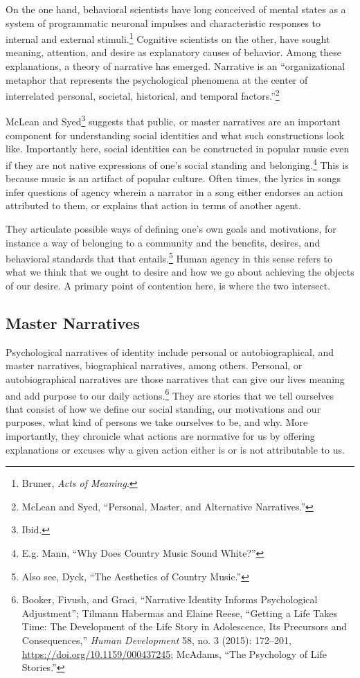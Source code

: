 \documentclass[phdthesis,12pt,final]{wuthesis}
\theoremstyle{definition}
\theoremstyle{definition}
\theoremstyle{definition}
\theoremstyle{definition}
\theoremstyle{remark}
\begin{document}
On the one hand, behavioral scientists have long conceived of mental states as a system of programmatic neuronal impulses and characteristic responses to internal and external stimuli.\footnote{Bruner, \emph{Acts of Meaning}.} Cognitive scientists on the other, have sought meaning, attention, and desire as explanatory causes of behavior. Among these explanations, a theory of narrative has emerged. Narrative is an ``organizational metaphor that represents the psychological phenomena at the center of interrelated personal, societal, historical, and temporal factors.''\footnote{McLean and Syed, {``Personal, {Master}, and {Alternative Narratives}.''}}

McLean and Syed\footnote{Ibid.} suggests that public, or master narratives are an important component for understanding social identities and what such constructions look like. Importantly here, social identities can be constructed in popular music even if they are not native expressions of one's social standing and belonging.\footnote{E.g. Mann, {``Why Does Country Music Sound White?''}} This is because music is an artifact of popular culture. Often times, the lyrics in songs infer questions of agency wherein a narrator in a song either endorses an action attributed to them, or explains that action in terms of another agent.

They articulate possible ways of defining one's own goals and motivations, for instance a way of belonging to a community and the benefits, desires, and behavioral standards that that entails.\footnote{Also see, Dyck, {``The Aesthetics of Country Music.''}} Human agency in this sense refers to what we think that we ought to desire and how we go about achieving the objects of our desire. A primary point of contention here, is where the two intersect.

\subsection*{Master Narratives}\label{master-narratives}

Psychological narratives of identity include personal or autobiographical, and master narratives, biographical narratives, among others. Personal, or autobiographical narratives are those narratives that can give our lives meaning and add purpose to our daily actions.\footnote{Booker, Fivush, and Graci, {``Narrative Identity Informs Psychological Adjustment''}; Tilmann Habermas and Elaine Reese, {``Getting a Life Takes Time: The Development of the Life Story in Adolescence, Its Precursors and Consequences,''} \emph{Human Development} 58, no. 3 (2015): 172--201, \url{https://doi.org/10.1159/000437245}; McAdams, {``The {Psychology} of {Life Stories}.''}} They are stories that we tell ourselves that consist of how we define our social standing, our motivations and our purposes, what kind of persons we take ourselves to be, and why. More importantly, they chronicle what actions are normative for us by offering explanations or excuses why a given action either is or is not attributable to us.
\end{document}
